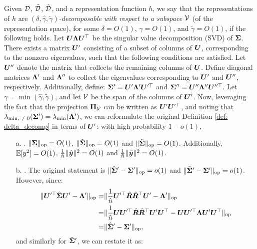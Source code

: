 \begin{definition}\label{def: restate} 
Given ${\mathcal{D}}$, $\tilde{{\mathcal{D}}}$, $\hat{{\mathcal{D}}}$, and a representation function $h$, we say that the representations of $h$ are \emph{$(\delta, \hat{\gamma}, \tilde{\gamma})$-decomposable with respect to a subspace ${\mathcal{V}}$} (of the representation space), for some $\delta=O(1)$,  $\hat{\gamma}=O(1)$, and $\tilde{\gamma}=O(1)$, if the following holds. Let ${\bm{U}} {\bm{\Lambda}} {\bm{U}}^\top$ be the singular value decomposition (SVD) of ${\bm{\Sigma}}$. There exists a matrix ${\bm{U}}'$ consisting of a subset of columns of ${\bm{U}}$, corresponding to the nonzero eigenvalues, such that the following conditions are satisfied. Let ${\bm{U}}''$ denote the matrix that collects the remaining columns of ${\bm{U}}$. Define diagonal matrices ${\bm{\Lambda}}'$ and ${\bm{\Lambda}}''$ to collect the eigenvalues corresponding to ${\bm{U}}'$ and ${\bm{U}}''$, respectively. Additionally, define: ${\bm{\Sigma}}' = {\bm{U}}' {\bm{\Lambda}}' {\bm{U}}'^\top $ and ${\bm{\Sigma}}'' = {\bm{U}}'' {\bm{\Lambda}}'' {\bm{U}}''^\top $. Let $\gamma = \min(\hat{\gamma}, \tilde{\gamma})$, and let ${\mathcal{V}}$ be the span of the columns of ${\bm{U}}'$. Now, leveraging the fact that the projection ${\bm{\Pi}}_{{\mathcal{V}}}$ can be written as ${\bm{U}}' {\bm{U}}'^\top$, and noting that $\lambda_{\text{min, $\neq 0$}}({\bm{\Sigma}}') = \lambda_{\min}({\bm{\Lambda}}')$, we can reformulate the original Definition \ref{def: delta_decomp} in terms of ${\bm{U}}'$: with high probability $1 - o(1)$,
\begin{itemize}
\item[a.] \bounded. $\lVert {\bm{\Sigma}} \rVert_{\mathrm{op}} = O(1)$, $\lVert \hat{{\bm{\Sigma}}} \rVert_{\mathrm{op}} = O(1)$ and $\lVert \tilde{{\bm{\Sigma}}} \rVert_{\mathrm{op}} = O(1)$. Additionally, $\mathbb{E}[y^2]=O(1)$, $\frac{1}{\hat{n}}\| \hat{{\bm{y}}} \|^2 = O(1)$ and $\frac{1}{\tilde{n}}\| \tilde{{\bm{y}}} \|^2 = O(1)$. 
    \item[b.] \conc{}. The original statement is $\lVert \hat{{\bm{\Sigma}}}' - {\bm{\Sigma}}' \rVert_{\mathrm{op}} = o(1)$ and $\lVert \tilde{{\bm{\Sigma}}}' - {\bm{\Sigma}}' \rVert_{\mathrm{op}} = o(1)$. However, since:
    \begin{align}
\nonumber
\lVert    {\bm{U}}'^\top\hat{{\bm{\Sigma}}} {\bm{U}}' -  {\bm{\Lambda}}'   \rVert_{\mathrm{op}}
  = & \lVert   \frac{1}{\hat{n}} {\bm{U}}'^\top\hat{{\bm{R}}} \hat{{\bm{R}}}^\top {\bm{U}}' - {\bm{\Lambda}}'  \rVert_{\mathrm{op}}\\
  \nonumber
  = &  \lVert   \frac{1}{\hat{n}} {\bm{U}}{\bm{U}}'^\top\hat{{\bm{R}}} \hat{{\bm{R}}}^\top {\bm{U}}'{\bm{U}}^\top -  {\bm{U}}{\bm{U}}'^\top{\bm{\Lambda}} {\bm{U}}'{\bm{U}}^\top  \rVert_{\mathrm{op}}\\
  \nonumber
  = & \lVert  \hat{{\bm{\Sigma}}}'-{\bm{\Sigma}}'  \rVert_{\mathrm{op}},
\end{align}
and similarly for $\tilde{{\bm{\Sigma}}}'$, we can restate it as:

\end{itemize}
\end{definition}
